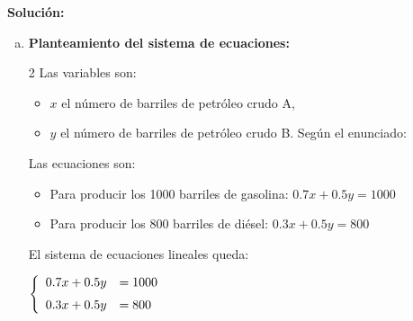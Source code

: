 \documentclass[11pt]{article}
\newcommand{\indicador}[4]{
{\tikz[remember picture,overlay]\coordinate (#1) at #2;}{\tikz[remember picture,overlay]\coordinate (#3) at #4;} 
}
\newcommand{\marka}[2]{
{\tikz[remember picture,overlay]\coordinate (#1) at #2;}
}
\begin{document}
\begin{enumerate}[\hspace{-7mm} 1) ]
\textbf{Solución:}


\begin{enumerate}[a) ]
    \item %

\textbf{Planteamiento del sistema de ecuaciones:}
\setlength{\columnsep}{9mm}
\begin{multicols}{2}
Las variables son:
\begin{itemize}
    \item  $x$ el número de barriles de petróleo crudo A,
    
    \item $y$ el número de barriles de petróleo crudo B. Según el enunciado:
\end{itemize} 

\columnbreak %

Las ecuaciones son: %

\begin{itemize}
    \item Para producir los 1000 barriles de gasolina: \quad $ 0.7x + 0.5y = 1000$
    
    \item Para producir los 800 barriles de diésel: \quad $ 0.3x + 0.5y = 800$
\end{itemize}

\end{multicols}

\bigskip

El sistema de ecuaciones lineales queda:  


$\left\{
\begin{array}{rl}
    0.7x + 0.5y &= 1000 \indicador{x}{(.1,.15)}{y}{(.5,-.25)}\marka{z}{(4.3,.15)}
    \\[2mm]
    0.3x + 0.5y &=  800 \marka{a}{(.1,.15)}
\end{array}
\right.$ 



\end{enumerate}
\end{enumerate}
\end{document}
